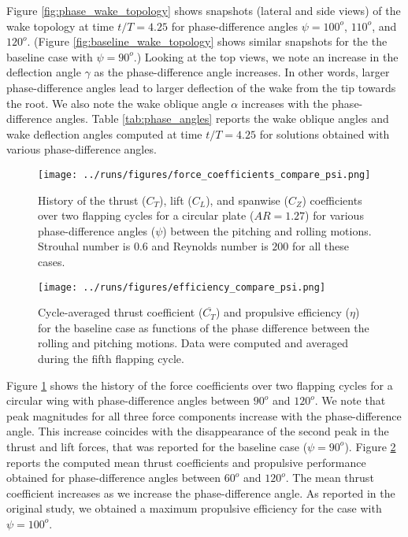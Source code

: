 Figure \ref{fig:phase_wake_topology} shows snapshots (lateral and side views) of the wake topology at time $t/T = 4.25$ for phase-difference angles $\psi = 100^o$, $110^o$, and $120^o$.
(Figure \ref{fig:baseline_wake_topology} shows similar snapshots for the the baseline case with $\psi = 90^o$.)
Looking at the top views, we note an increase in the deflection angle $\gamma$ as the phase-difference angle increases.
In other words, larger phase-difference angles lead to larger deflection of the wake from the tip towards the root.
We also note the wake oblique angle $\alpha$ increases with the phase-difference angles.
Table \ref{tab:phase_angles} reports the wake oblique angles and wake deflection angles computed at time $t/T = 4.25$ for solutions obtained with various phase-difference angles.

\begin{figure}
  \centering
  \texttt{[image: ../runs/figures/force\_coefficients\_compare\_psi.png]}
  \caption{History of the thrust ($C_T$), lift ($C_L$), and spanwise ($C_Z$) coefficients over two flapping cycles for a circular plate ($AR = 1.27$) for various phase-difference angles ($\psi$) between the pitching and rolling motions. Strouhal number is $0.6$ and Reynolds number is $200$ for all these cases.}
  \label{fig:phase_force_coefficients}
\end{figure}

\begin{figure}
  \centering
  \texttt{[image: ../runs/figures/efficiency\_compare\_psi.png]}
  \caption{Cycle-averaged thrust coefficient ($\overline{C_T}$) and propulsive efficiency ($\eta$) for the baseline case as functions of the phase difference between the rolling and pitching motions. Data were computed and averaged during the fifth flapping cycle.}
  \label{fig:phase_efficiency}
\end{figure}

Figure \ref{fig:phase_force_coefficients} shows the history of the force coefficients over two flapping cycles for a circular wing with phase-difference angles between $90^o$ and $120^o$.
We note that peak magnitudes for all three force components increase with the phase-difference angle.
This increase coincides with the disappearance of the second peak in the thrust and lift forces, that was reported for the baseline case ($\psi = 90^o$).
Figure \ref{fig:phase_efficiency} reports the computed mean thrust coefficients and propulsive performance obtained for phase-difference angles between $60^o$ and $120^o$.
The mean thrust coefficient increases as we increase the phase-difference angle.
As reported in the original study, we obtained a maximum propulsive efficiency for the case with $\psi = 100^o$.

